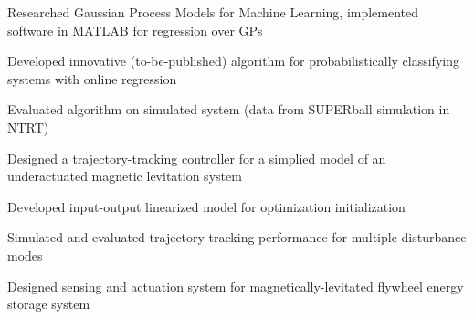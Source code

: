 \documentclass[letterpaper]{deedy-resume} %
\begin{document}
\begin{minipage}[t]{1\textwidth}
\begin{tightitemize}
\item Researched Gaussian Process Models for Machine Learning, implemented software in MATLAB for regression over GPs

\item Developed innovative (to-be-published) algorithm for probabilistically classifying systems with online regression

\item Evaluated algorithm on simulated system (data from SUPERball simulation in NTRT)

\end{tightitemize}

\sectionspace %



\vspace{\topsep} %
\begin{tightitemize}

\item Designed a trajectory-tracking controller for a simplied model of an underactuated magnetic levitation system

\item Developed input-output linearized model for optimization initialization

\item Simulated and evaluated trajectory tracking performance for multiple disturbance modes

\end{tightitemize}

\sectionspace %




\vspace{\topsep} %
\begin{tightitemize}

\item Designed sensing and actuation system for magnetically-levitated flywheel energy storage system


\end{tightitemize}
\end{minipage}
\end{document}
